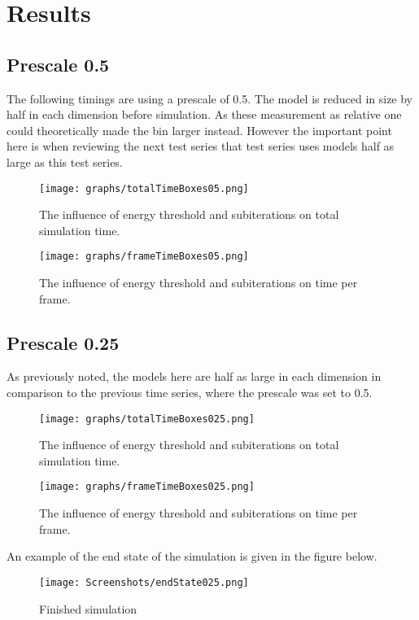 \section{Results}
\subsection{Prescale 0.5}
The following timings are using a prescale of 0.5. The model is reduced in size by
half in each dimension before simulation. As these measurement as relative one could
theoretically made the bin larger instead. However the important point here is when reviewing the
next test series that test series uses models half as large as this test series.
\begin{figure}[H]
  \centering
  \texttt{[image: graphs/totalTimeBoxes05.png]}
  \caption{The influence of energy threshold and subiterations on total simulation time.}
  \label{fig:totalTimeBoxes05}
\end{figure}

\begin{figure}[H]
  \centering
  \texttt{[image: graphs/frameTimeBoxes05.png]}
  \caption{The influence of energy threshold and subiterations on time per frame.}
  \label{fig:frameTimeBoxes05}
\end{figure}

\subsection{Prescale 0.25}
As previously noted, the models here are half as large in each dimension in comparison to
the previous time series, where the prescale was set to 0.5.
\begin{figure}[H]
  \centering
  \texttt{[image: graphs/totalTimeBoxes025.png]}
  \caption{The influence of energy threshold and subiterations on total simulation time.}
  \label{fig:totalTimeBoxes025}
\end{figure}

\begin{figure}[H]
  \centering
  \texttt{[image: graphs/frameTimeBoxes025.png]}
  \caption{The influence of energy threshold and subiterations on time per frame.}
  \label{fig:frameTimeBoxes025}
\end{figure}

An example of the end state of the simulation is given in the figure below.
\begin{figure}[H]
  \centering
  \texttt{[image: Screenshots/endState025.png]}
  \caption{Finished simulation}
  \label{fig:endstate}
\end{figure}

